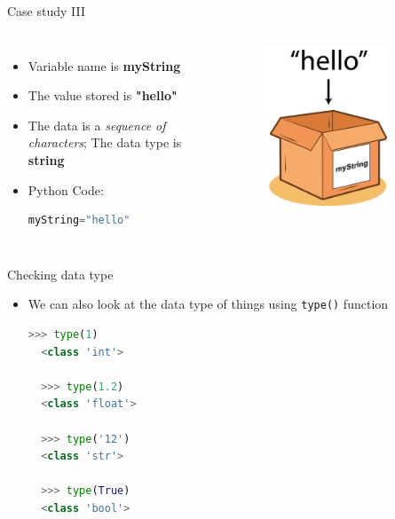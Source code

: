 \documentclass[10pt,xcolor={table,dvipsnames},t]{beamer}
\begin{document}
\begin{frame}[fragile]{Case study III}
  \begin{columns}
    \begin{itemize}
      \item Variable name is \textbf{myString}
      \item The value stored is \textbf{"hello"}
      \item The data is a \textit{sequence of characters}; The data type is \textbf{string}
      \item Python Code:\\\begin{lstlisting}[language=python]
    myString="hello"\end{lstlisting}
    \end{itemize}
    \begin{figure}
      \includegraphics[width=0.8\textwidth]{img/variable-str.png}
    \end{figure}
  \end{columns}
\end{frame}

\begin{frame}[fragile]{Checking data type}
  \begin{itemize}
    \item We can also look at the data type of things using \texttt{type()} function
\begin{lstlisting}[language=python]
  >>> type(1)
  <class 'int'>

  >>> type(1.2)
  <class 'float'>

  >>> type('12')
  <class 'str'>
  
  >>> type(True)
  <class 'bool'>
\end{lstlisting}
  \end{itemize}
\end{frame}
\end{document}
